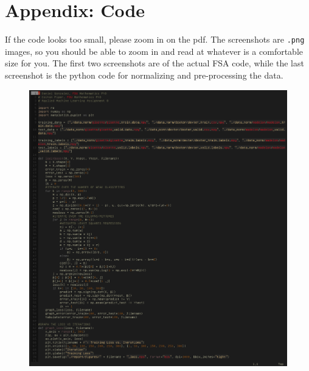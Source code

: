 \documentclass[UTF8]{article}
\begin{document}
\section{Appendix: Code}
If the code looks too small, please zoom in on the pdf.
The screenshots are \texttt{.png} images, so you should be able to zoom in and read at whatever is a comfortable size for you.
The first two screenshots are of the actual FSA code, while the last screenshot is the python code for normalizing and pre-processing the data.
\begin{figure}[H]
    \centering
    \includegraphics[scale=0.7]{./figures/code1.png}
\end{figure}
\end{document}
